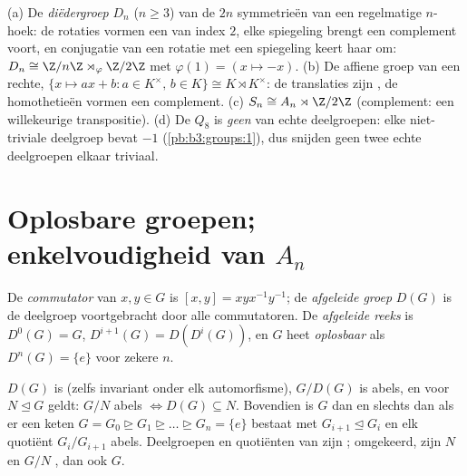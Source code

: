 \begin{example}\label{ex:b3:groups:semidirectexamples}
(a) De \emph{diëdergroep} $D_n$ ($n \geq 3$) van
de $2n$ symmetrieën van een regelmatige $n$-hoek: de rotaties
vormen een  van index $2$, elke spiegeling brengt een
complement voort, en conjugatie van een rotatie met een spiegeling
keert haar om: $D_n \cong \Z/n\Z \rtimes_\varphi \Z/2\Z$ met
$\varphi(1) = (x \mapsto -x)$.
(b) De affiene groep van een rechte, $\{x \mapsto ax + b : a \in
K^\times,\, b \in K\} \cong K \rtimes K^\times$: de translaties
zijn , de homothetieën vormen een complement.
(c) $S_n \cong A_n \rtimes \Z/2\Z$ (complement: een willekeurige
transpositie).
(d) De  $Q_8$ is \emph{geen} 
van echte deelgroepen: elke niet-triviale deelgroep bevat $-1$
(\cref{pb:b3:groups:1}), dus snijden geen twee echte deelgroepen
elkaar triviaal.
\end{example}

\section{Oplosbare groepen; enkelvoudigheid van \texorpdfstring{$A_n$}{An}}

\begin{definition}\label{def:b3:groups:derived}
De \emph{commutator} van $x, y \in G$ is $[x,y]
= xyx^{-1}y^{-1}$; de \emph{afgeleide groep} $D(G)$ is de deelgroep voortgebracht door alle
commutatoren. De \emph{afgeleide reeks} is $D^0(G) = G$,
$D^{i+1}(G) = D(D^i(G))$, en $G$ heet
\emph{oplosbaar} als $D^n(G) = \{e\}$ voor
zekere $n$.
\end{definition}

\begin{proposition}\label{prop:b3:groups:derived}
$D(G)$ is  (zelfs invariant onder elk automorfisme),
$G/D(G)$ is abels, en voor $N \trianglelefteq G$ geldt: $G/N$ abels
$\iff D(G) \subseteq N$. Bovendien is $G$  dan en slechts
dan als er een keten $G = G_0 \trianglerighteq G_1
\trianglerighteq \dots \trianglerighteq G_n = \{e\}$ bestaat met
$G_{i+1} \trianglelefteq G_i$ en elk quotiënt $G_i/G_{i+1}$ abels.
Deelgroepen en quotiënten van  zijn ;
omgekeerd, zijn $N$ en $G/N$ , dan ook $G$.
\end{proposition}


